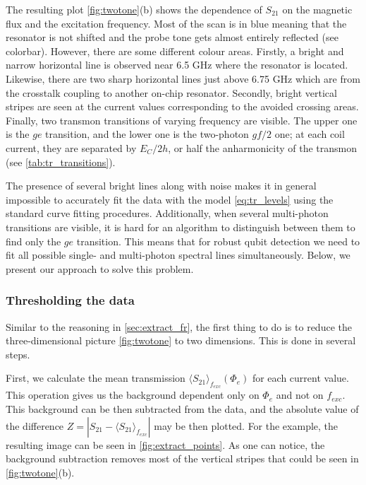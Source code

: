 \documentclass[%
 aip,
 amsmath,amssymb,
 reprint,%
]{revtex4-1}
\begin{document}
The resulting plot \autoref{fig:twotone}(b) shows the dependence of $S_{21}$ on the magnetic flux and the excitation frequency. Most of the scan is in blue meaning that the resonator is not shifted and the probe tone gets almost entirely reflected (see colorbar). However, there are some different colour areas. Firstly, a bright and narrow horizontal line is observed near 6.5 GHz where the resonator is located. Likewise, there are two sharp horizontal lines just above 6.75 GHz which are from the crosstalk coupling to another on-chip resonator. Secondly, bright vertical stripes are seen at the current values corresponding to the avoided crossing areas. Finally, two transmon transitions of varying frequency are visible. The upper one is the $ge$ transition, and the lower one is the two-photon $gf/2$ one; at each coil current, they are separated by $E_C/2h$, or half the anharmonicity of the transmon (see \autoref{tab:tr_transitions}).

The presence of several bright lines along with noise makes it in general impossible to accurately fit the data with the model \eqref{eq:tr_levels} using the standard curve fitting procedures. Additionally, when several multi-photon transitions are visible, it is hard for an algorithm to distinguish between them to find only the $ge$ transition. This means that for robust qubit detection we need to fit all possible single- and multi-photon spectral lines simultaneously. Below, we present our approach to solve this problem.



\subsubsection{Thresholding the data}

Similar to the reasoning in \autoref{sec:extract_fr}, the first thing to do is to reduce the three-dimensional picture \autoref{fig:twotone} to two dimensions. This is done in several steps.

First, we calculate the mean transmission $\langle S_{21}\rangle_{f_{exc}} (\Phi_{e})$ for each current value. This operation gives us the background dependent only on $\Phi_e$ and not on  $ f_{exc} $. This background can be then subtracted from the data, and the absolute value of the difference $ Z = \left| S_{21} - \langle S_{21}\rangle_{f_{exc}} \right |$ may be then plotted. For the example, the resulting image can be seen in \autoref{fig:extract_points}. As one can notice, the background subtraction removes most of the vertical stripes that could be seen in \autoref{fig:twotone}(b).
\end{document}
